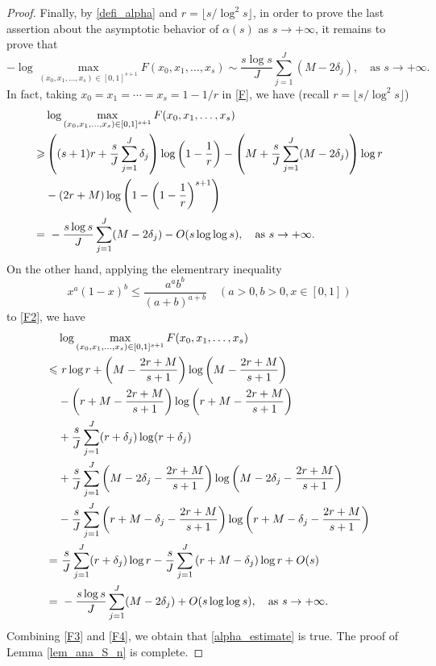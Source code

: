 \documentclass[12pt]{article}
\numberwithin{equation}{section}
\begin{document}
\begin{proof}
Finally, by \eqref{defi_alpha} and $r =\lfloor s/\log^2 s \rfloor$, in order to prove the last assertion about the asymptotic behavior of $\alpha(s)$ as $s \to +\infty$, it remains to prove that
\begin{equation}\label{alpha_estimate}
	-\log \max_{(x_0,x_1,\ldots,x_s) \in [0,1]^{s+1}} F(x_0,x_1,\ldots,x_s) \sim \frac{s\log s}{J}\sum_{j=1}^{J} (M-2\delta_j), \quad \text{as~} s\to +\infty.
\end{equation}
In fact, taking $x_0=x_1=\cdots=x_s = 1-1/r$ in \eqref{F}, we have (recall $r=\lfloor s/\log^2 s\rfloor$)
\begin{align}
&\log \max_{(x_0,x_1,\ldots,x_s) \in [0,1]^{s+1}} F(x_0,x_1,\ldots,x_s) \notag\\
\geqslant& \left( (s+1)r + \frac{s}{J}\sum_{j=1}^{J} \delta_j \right)\log\left( 1-\frac{1}{r} \right) - \left( M + \frac{s}{J}\sum_{j=1}^{J} (M-2\delta_j) \right) \log r \notag\\
&- (2r+M)\log\left( 1-\left( 1-\frac{1}{r} \right)^{s+1} \right) \notag\\
=&~ -\frac{s\log s}{J}\sum_{j=1}^{J} (M-2\delta_j) - O(s\log\log s), \quad \text{as~} s \to +\infty. \label{F3}
\end{align}
On the other hand, applying the elementrary inequality 
\[ x^{a}(1-x)^b \leqslant \frac{a^ab^b}{(a+b)^{a+b}} \quad  (a>0, b>0, x \in [0,1]) \] 
to \eqref{F2}, we have
\begin{align}
&\log \max_{(x_0,x_1,\ldots,x_s) \in [0,1]^{s+1}} F(x_0,x_1,\ldots,x_s) \notag\\
\leqslant&~ r\log r  + \left( M-\frac{2r+M}{s+1} \right)\log\left( M-\frac{2r+M}{s+1} \right) \notag\\
&-\left( r+M - \frac{2r+M}{s+1} \right)\log\left(  r+M - \frac{2r+M}{s+1} \right) \notag\\ &+\frac{s}{J}\sum_{j=1}^{J}(r+\delta_j)\log(r+\delta_j)   \notag\\
&+ \frac{s}{J}\sum_{j=1}^{J} \left( M-2\delta_j - \frac{2r+M}{s+1} \right) \log\left( M-2\delta_j - \frac{2r+M}{s+1} \right) \notag\\
&- \frac{s}{J}\sum_{j=1}^{J} \left( r+M-\delta_j - \frac{2r+M}{s+1} \right)\log\left(  r+M-\delta_j - \frac{2r+M}{s+1} \right) \notag\\
=&~ \frac{s}{J}\sum_{j=1}^{J} (r+\delta_j)\log r - \frac{s}{J}\sum_{j=1}^{J}\left( r+M-\delta_j \right)\log r + O(s) \notag\\
=&~ -\frac{s\log s}{J}\sum_{j=1}^{J} (M-2\delta_j) + O(s\log\log s), \quad \text{as~} s \to +\infty. \label{F4}
\end{align}
Combining \eqref{F3} and \eqref{F4}, we obtain that \eqref{alpha_estimate} is true. The proof of Lemma \ref{lem_ana_S_n} is complete.
\end{proof}
\end{document}
